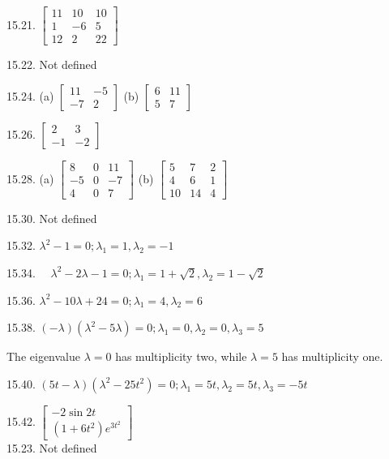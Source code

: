 \documentclass[10pt]{article}
\begin{document}
15.21. $\left[\begin{array}{rrr}11 & 10 & 10 \\ 1 & -6 & 5 \\ 12 & 2 & 22\end{array}\right]$

15.22. Not defined

15.24. (a) $\left[\begin{array}{cc}11 & -5 \\ -7 & 2\end{array}\right]$ (b) $\left[\begin{array}{cc}6 & 11 \\ 5 & 7\end{array}\right]$

15.26. $\left[\begin{array}{rr}2 & 3 \\ -1 & -2\end{array}\right]$

15.28. (a) $\left[\begin{array}{rrr}8 & 0 & 11 \\ -5 & 0 & -7 \\ 4 & 0 & 7\end{array}\right]$ (b) $\left[\begin{array}{rrr}5 & 7 & 2 \\ 4 & 6 & 1 \\ 10 & 14 & 4\end{array}\right]$

15.30. Not defined

15.32. $\lambda^{2}-1=0 ; \lambda_{1}=1, \lambda_{2}=-1$

15.34. $\quad \lambda^{2}-2 \lambda-1=0 ; \lambda_{1}=1+\sqrt{2}, \lambda_{2}=1-\sqrt{2}$

15.36. $\lambda^{2}-10 \lambda+24=0 ; \lambda_{1}=4, \lambda_{2}=6$

15.38. $(-\lambda)\left(\lambda^{2}-5 \lambda\right)=0 ; \lambda_{1}=0, \lambda_{2}=0, \lambda_{3}=5$

The eigenvalue $\lambda=0$ has multiplicity two, while $\lambda=5$ has multiplicity one.

15.40. $(5 t-\lambda)\left(\lambda^{2}-25 t^{2}\right)=0 ; \lambda_{1}=5 t, \lambda_{2}=5 t, \lambda_{3}=-5 t$

15.42. $\left[\begin{array}{c}-2 \sin 2 t \\ \left(1+6 t^{2}\right) e^{3 t^{2}}\end{array}\right]$\\
15.23. Not defined
\end{document}
